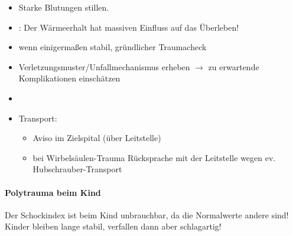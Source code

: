{\begin{itemize}
\begin{itemize}
{\begin{enumerate}
      \item Schock $\rightarrow$ Schocklagerung durch schräg stellen des Tragentisches
    \end{enumerate}
    }
  \end{itemize}
  \item Starke Blutungen stillen.
  \item {}: Der Wärmeerhalt hat massiven Einfluss auf das
  Überleben!
  \item wenn einigermaßen stabil, gründlicher  Traumacheck
  \item Verletzungsmuster/Unfallmechanismus erheben $\rightarrow$ zu 
  erwartende Komplikationen einschätzen
  \item {}
  \item Transport:
  \begin{itemize}
    \item Aviso im Zielspital (über Leitstelle)
    \item bei Wirbelsäulen-Trauma Rücksprache mit der Leitstelle wegen ev. Hubschrauber-Transport
  \end{itemize}
\end{itemize}
}




\paragraph{Polytrauma beim Kind} Der Schockindex ist beim Kind unbrauchbar, da die
Normalwerte andere sind! Kinder bleiben lange stabil, verfallen dann aber schlagartig!


